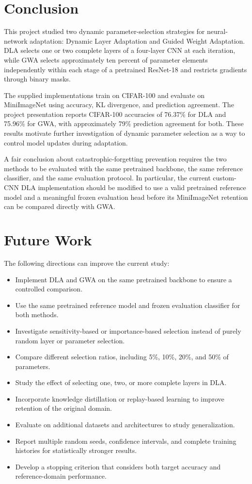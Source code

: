 \documentclass[12pt,a4paper]{report}
\begin{document}
\section{Conclusion}
This project studied two dynamic parameter-selection strategies for
neural-network adaptation: Dynamic Layer Adaptation and Guided Weight
Adaptation. DLA selects one or two complete layers of a four-layer CNN
at each iteration, while GWA selects approximately ten percent of
parameter elements independently within each stage of a pretrained
ResNet-18 and restricts gradients through binary masks.

The supplied implementations train on CIFAR-100 and evaluate on
MiniImageNet using accuracy, KL divergence, and prediction agreement.
The project presentation reports CIFAR-100 accuracies of 76.37\% for
DLA and 75.96\% for GWA, with approximately 79\% prediction agreement
for both. These results motivate further investigation of dynamic
parameter selection as a way to control model updates during
adaptation.

A fair conclusion about catastrophic-forgetting prevention requires
the two methods to be evaluated with the same pretrained backbone,
the same reference classifier, and the same evaluation protocol.
In particular, the current custom-CNN DLA implementation should be
modified to use a valid pretrained reference model and a meaningful
frozen evaluation head before its MiniImageNet retention can be
compared directly with GWA.

\section{Future Work}
The following directions can improve the current study:
\begin{itemize}
    \item Implement DLA and GWA on the same pretrained backbone to
    ensure a controlled comparison.
    \item Use the same pretrained reference model and frozen
    evaluation classifier for both methods.
    \item Investigate sensitivity-based or importance-based selection
    instead of purely random layer or parameter selection.
    \item Compare different selection ratios, including 5\%, 10\%,
    20\%, and 50\% of parameters.
    \item Study the effect of selecting one, two, or more complete
    layers in DLA.
    \item Incorporate knowledge distillation or replay-based learning
    to improve retention of the original domain.
    \item Evaluate on additional datasets and architectures to study
    generalization.
    \item Report multiple random seeds, confidence intervals, and
    complete training histories for statistically stronger results.
    \item Develop a stopping criterion that considers both target
    accuracy and reference-domain performance.
\end{itemize}
\end{document}
